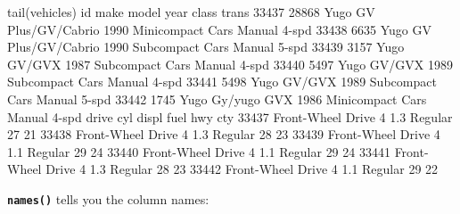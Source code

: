 \documentclass[
]{book}
\newenvironment{Shaded}{\begin{snugshade}}{\end{snugshade}}
\newcommand{\DecValTok}[1]{\textcolor[rgb]{0.00,0.00,0.81}{#1}}
\newcommand{\FloatTok}[1]{\textcolor[rgb]{0.00,0.00,0.81}{#1}}
\newcommand{\FunctionTok}[1]{\textcolor[rgb]{0.00,0.00,0.00}{#1}}
\newcommand{\NormalTok}[1]{#1}
\newcommand{\SpecialCharTok}[1]{\textcolor[rgb]{0.00,0.00,0.00}{#1}}
\begin{document}
\begin{Shaded}
\begin{Highlighting}[]
\FunctionTok{tail}\NormalTok{(vehicles) }
\NormalTok{         id make             model year            class        trans}
\DecValTok{33437} \DecValTok{28868}\NormalTok{ Yugo GV Plus}\SpecialCharTok{/}\NormalTok{GV}\SpecialCharTok{/}\NormalTok{Cabrio }\DecValTok{1990}\NormalTok{ Minicompact Cars Manual }\DecValTok{4}\SpecialCharTok{{-}}\NormalTok{spd}
\DecValTok{33438}  \DecValTok{6635}\NormalTok{ Yugo GV Plus}\SpecialCharTok{/}\NormalTok{GV}\SpecialCharTok{/}\NormalTok{Cabrio }\DecValTok{1990}\NormalTok{  Subcompact Cars Manual }\DecValTok{5}\SpecialCharTok{{-}}\NormalTok{spd}
\DecValTok{33439}  \DecValTok{3157}\NormalTok{ Yugo            GV}\SpecialCharTok{/}\NormalTok{GVX }\DecValTok{1987}\NormalTok{  Subcompact Cars Manual }\DecValTok{4}\SpecialCharTok{{-}}\NormalTok{spd}
\DecValTok{33440}  \DecValTok{5497}\NormalTok{ Yugo            GV}\SpecialCharTok{/}\NormalTok{GVX }\DecValTok{1989}\NormalTok{  Subcompact Cars Manual }\DecValTok{4}\SpecialCharTok{{-}}\NormalTok{spd}
\DecValTok{33441}  \DecValTok{5498}\NormalTok{ Yugo            GV}\SpecialCharTok{/}\NormalTok{GVX }\DecValTok{1989}\NormalTok{  Subcompact Cars Manual }\DecValTok{5}\SpecialCharTok{{-}}\NormalTok{spd}
\DecValTok{33442}  \DecValTok{1745}\NormalTok{ Yugo       Gy}\SpecialCharTok{/}\NormalTok{yugo GVX }\DecValTok{1986}\NormalTok{ Minicompact Cars Manual }\DecValTok{4}\SpecialCharTok{{-}}\NormalTok{spd}
\NormalTok{                  drive cyl displ    fuel hwy cty}
\DecValTok{33437}\NormalTok{ Front}\SpecialCharTok{{-}}\NormalTok{Wheel Drive   }\DecValTok{4}   \FloatTok{1.3}\NormalTok{ Regular  }\DecValTok{27}  \DecValTok{21}
\DecValTok{33438}\NormalTok{ Front}\SpecialCharTok{{-}}\NormalTok{Wheel Drive   }\DecValTok{4}   \FloatTok{1.3}\NormalTok{ Regular  }\DecValTok{28}  \DecValTok{23}
\DecValTok{33439}\NormalTok{ Front}\SpecialCharTok{{-}}\NormalTok{Wheel Drive   }\DecValTok{4}   \FloatTok{1.1}\NormalTok{ Regular  }\DecValTok{29}  \DecValTok{24}
\DecValTok{33440}\NormalTok{ Front}\SpecialCharTok{{-}}\NormalTok{Wheel Drive   }\DecValTok{4}   \FloatTok{1.1}\NormalTok{ Regular  }\DecValTok{29}  \DecValTok{24}
\DecValTok{33441}\NormalTok{ Front}\SpecialCharTok{{-}}\NormalTok{Wheel Drive   }\DecValTok{4}   \FloatTok{1.3}\NormalTok{ Regular  }\DecValTok{28}  \DecValTok{23}
\DecValTok{33442}\NormalTok{ Front}\SpecialCharTok{{-}}\NormalTok{Wheel Drive   }\DecValTok{4}   \FloatTok{1.1}\NormalTok{ Regular  }\DecValTok{29}  \DecValTok{22}
\end{Highlighting}
\end{Shaded}

\textbf{\texttt{names()}} tells you the column names:
\end{document}
